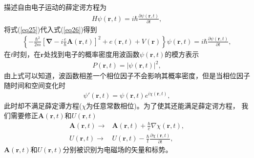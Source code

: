 描述自由电子运动的薛定谔方程为
\begin{align}
H\psi (\bm{r},t) = i\hbar \frac{{\partial \psi(\bm{r},t) }}{{\partial t}},\label{eq26}
\end{align}
将式(\ref{eq25})代入式(\ref{eq26})得到
\begin{align}
\left\{ { - \frac{{{\hbar ^2}}}{{2m}}{{\left[ {\bm{\nabla}  - i\frac{e}{\hbar }\bm{A}(\bm{r},t)} \right]}^2} + e(\bm{r},t) + V(\bm{r})} \right\}\psi(\bm{r},t)  = i\hbar \frac{{\partial \psi(\bm{r},t) }}{{\partial t}},\label{eq27}
\end{align}
在$t$时刻，在$\bm{r}$处找到电子的概率密度用波函数$\psi(\bm{r},t)$的模方表示
\begin{align}
P\left( {\bm{r},t} \right) = {\left| {\psi \left( {\bm{r},t} \right)} \right|^2},\label{eq28}
\end{align}
由上式可以知道，波函数相差一个相位因子不会影响其概率密度，但是当相位因子随时间和空间变化时
\begin{align}
\psi '\left( {\bm{r},t} \right) = \psi \left( {\bm{r},t} \right){e^{i\chi (\bm{r},t)}},\label{eq29}
\end{align}
此时却不满足薛定谭方程($\chi$为任意常数相位)。为了使其还能满足薛定谔方程，
我们需要修正$\bm{A}(\bm{r},t)$和$U(\bm{r},t)$
\begin{align}
\bm{A}(\bm{r},t) \to &\bm{A}(\bm{r},t) + \frac{\hbar }{e}\nabla \chi (\bm{r},t),\label{eq31}\\
U(\bm{r},t) \to &U(\bm{r},t) - \frac{\hbar }{t}\frac{{\partial \chi (\bm{r},t)}}{{\partial t}},\label{eq32}
\end{align}
$\bm{A}(\bm{r},t)$和$U(\bm{r},t)$分别被识别为电磁场的矢量和标势。

